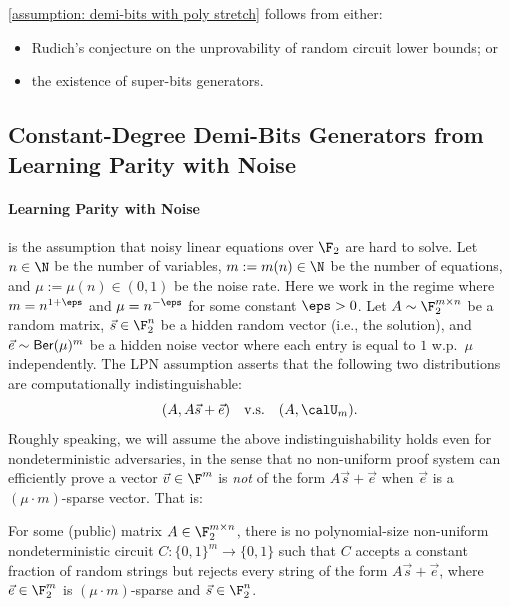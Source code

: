 \begin{proposition}
    \autoref{assumption: demi-bits with poly stretch} follows from either:\begin{itemize}
        \item Rudich's conjecture on the unprovability of random circuit lower bounds; or
        \item the existence of super-bits generators.
    \end{itemize}
\end{proposition}




\subsection{Constant-Degree Demi-Bits Generators from Learning Parity with Noise}

\paragraph{Learning Parity with Noise} is the assumption that noisy linear equations over $\F_2$ are hard to solve. Let $n\in \N$ be the number of variables, $m := m(n)\in \N$ be the number of equations, and $\mu := \mu(n) \in (0, 1)$ be the noise rate. Here we work in the regime where $m = n^{1+\eps}$ and $\mu = n^{-\eps}$ for some constant $\eps > 0$. Let $A \sim \F_2^{m\times n}$ be a random matrix, $\vec{s}\in \F_2^n$ be a hidden random vector (i.e., the solution), and $\vec{e}\sim {\sf Ber}(\mu)^m$ be a hidden noise vector where each entry is equal to $1$ w.p.~$\mu$ independently. The LPN assumption asserts that the following two distributions are computationally indistinguishable:
\[(A, A\vec{s} + \vec{e})\quad\text{v.s.}\quad (A, \calU_m).\]
Roughly speaking, we will assume the above indistinguishability holds even for nondeterministic adversaries, in the sense that no non-uniform proof system can efficiently prove a vector $\vec{v} \in \F^m$ is \emph{not} of the form $A\vec{s} + \vec{e}$ when $\vec{e}$ is a $(\mu\cdot m)$-sparse vector. That is:

\begin{assumption}\label{assumption: demi-hardness of LPN}
    For some (public) matrix $A\in \F_2^{m\times n}$, there is no polynomial-size non-uniform nondeterministic circuit $C: \{0, 1\}^m \to \{0, 1\}$ such that $C$ accepts a constant fraction of random strings but rejects every string of the form $A\vec{s} + \vec{e}$, where $\vec{e} \in \F_2^m$ is $(\mu\cdot m)$-sparse and $\vec{s} \in \F_2^n$.
\end{assumption}

